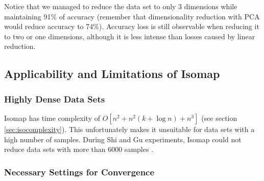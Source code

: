 \documentclass[12pt]{article}
\begin{document}
Notice that we managed to reduce the data set to only 3 dimensions while maintaining 91\% of accuracy (remember that dimensionality reduction with PCA would reduce accuracy to 74\%). Accuracy loss is still observable when reducing it to two or one dimensions, although it is less intense than losses caused by linear reduction.

\subsection{Applicability and Limitations of Isomap}

\subsubsection{Highly Dense Data Sets}

Isomap has time complexity of $O[n^2 + n^2(k + \log n) + n^3]$ (see section \ref{sec:isocomplexity}). This unfortunately makes it unsuitable for data sets with a high number of samples. During Shi and Gu experiments, Isomap could not reduce data sets with more than 6000 samples \cite{shi2012fast}.

\subsubsection{Necessary Settings for Convergence}
\end{document}

